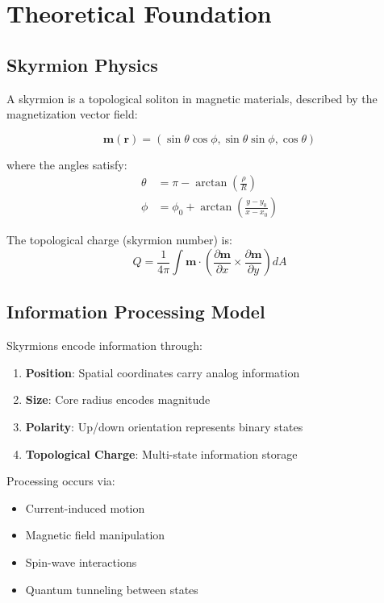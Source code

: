 \documentclass[12pt,a4paper]{article}
\begin{document}
\section{Theoretical Foundation}

\subsection{Skyrmion Physics}

A skyrmion is a topological soliton in magnetic materials, described by the magnetization vector field:

\[
\mathbf{m}(\mathbf{r}) = (\sin\theta\cos\phi, \sin\theta\sin\phi, \cos\theta)
\]

where the angles satisfy:
\begin{align}
\theta &= \pi - \arctan\left(\frac{\rho}{R}\right) \\
\phi &= \phi_0 + \arctan\left(\frac{y - y_0}{x - x_0}\right)
\end{align}

The topological charge (skyrmion number) is:
\[
Q = \frac{1}{4\pi} \int \mathbf{m} \cdot \left(\frac{\partial\mathbf{m}}{\partial x} \times \frac{\partial\mathbf{m}}{\partial y}\right) dA
\]

\subsection{Information Processing Model}

Skyrmions encode information through:
\begin{enumerate}
    \item \textbf{Position}: Spatial coordinates carry analog information
    \item \textbf{Size}: Core radius encodes magnitude
    \item \textbf{Polarity}: Up/down orientation represents binary states
    \item \textbf{Topological Charge}: Multi-state information storage
\end{enumerate}

Processing occurs via:
\begin{itemize}
    \item Current-induced motion
    \item Magnetic field manipulation
    \item Spin-wave interactions
    \item Quantum tunneling between states
\end{itemize}
\end{document}
